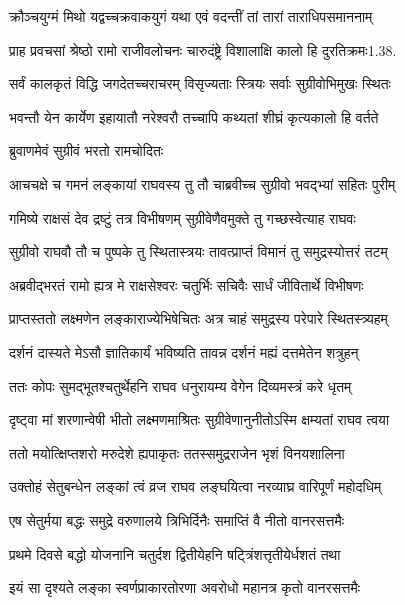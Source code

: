 \twolineshloka
{क्रौञ्चयुग्मं मिथो यद्वच्चक्रवाकयुगं यथा}
{एवं वदन्तीं तां तारां ताराधिपसमाननाम्}%

\twolineshloka
{प्राह प्रवचसां श्रेष्ठो रामो राजीवलोचनः}
{चारुदंष्ट्रे विशालाक्षि कालो हि दुरतिक्रमः1.38.}%

\twolineshloka
{सर्वं कालकृतं विद्धि जगदेतच्चराचरम्}
{विसृज्यताः स्त्रियः सर्वाः सुग्रीवोभिमुखः स्थितः}%


\twolineshloka
{भवन्तौ येन कार्येण इहायातौ नरेश्वरौ}
{तच्चापि कथ्यतां शीघ्रं कृत्यकालो हि वर्तते}%

ब्रुवाणमेवं सुग्रीवं भरतो रामचोदितः

\twolineshloka
{आचचक्षे च गमनं लङ्कायां राघवस्य तु}
{तौ चाब्रवीच्च सुग्रीवो भवद्भ्यां सहितः पुरीम्}%

\twolineshloka
{गमिष्ये राक्षसं देव द्रष्टुं तत्र विभीषणम्}
{सुग्रीवेणैवमुक्ते तु गच्छस्वेत्याह राघवः}%

\twolineshloka
{सुग्रीवो राघवौ तौ च पुष्पके तु स्थितास्त्रयः}
{तावत्प्राप्तं विमानं तु समुद्रस्योत्तरं तटम्}%

\twolineshloka
{अब्रवीद्भरतं रामो ह्यत्र मे राक्षसेश्वरः}
{चतुर्भिः सचिवैः सार्धं जीवितार्थे विभीषणः}%

\twolineshloka
{प्राप्तस्ततो लक्ष्मणेन लङ्काराज्येभिषेचितः}
{अत्र चाहं समुद्रस्य परेपारे स्थितस्त्र्यहम्}%

\twolineshloka
{दर्शनं दास्यते मेऽसौ ज्ञातिकार्यं भविष्यति}
{तावन्न दर्शनं मह्यं दत्तमेतेन शत्रुहन्}%

\twolineshloka
{ततः कोपः सुमद्भूतश्चतुर्थेहनि राघव}
{धनुरायम्य वेगेन दिव्यमस्त्रं करे धृतम्}%

\twolineshloka
{दृष्ट्वा मां शरणान्वेषी भीतो लक्ष्मणमाश्रितः}
{सुग्रीवेणानुनीतोऽस्मि क्षम्यतां राघव त्वया}%

\twolineshloka
{ततो मयोत्क्षिप्तशरो मरुदेशे ह्यपाकृतः}
{ततस्समुद्रराजेन भृशं विनयशालिना}%

\twolineshloka
{उक्तोहं सेतुबन्धेन लङ्कां त्वं व्रज राघव}
{लङ्घयित्वा नरव्याघ्र वारिपूर्णं महोदधिम्}%

\twolineshloka
{एष सेतुर्मया बद्धः समुद्रे वरुणालये}
{त्रिभिर्दिनैः समाप्तिं वै नीतो वानरसत्तमैः}%

\twolineshloka
{प्रथमे दिवसे बद्धो योजनानि चतुर्दश}
{द्वितीयेहनि षट्त्रिंशत्तृतीयेर्धशतं तथा}%

\twolineshloka
{इयं सा दृश्यते लङ्का स्वर्णप्राकारतोरणा}
{अवरोधो महानत्र कृतो वानरसत्तमैः}%

